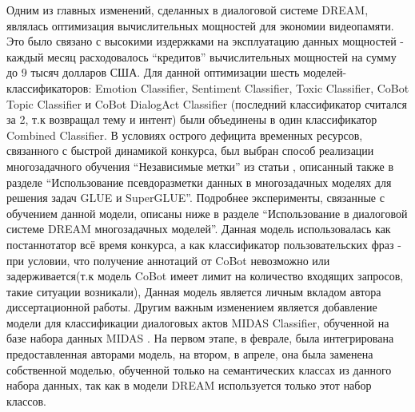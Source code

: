 Одним из главных изменений, сделанных в диалоговой системе DREAM, являлась оптимизация вычислительных мощностей для экономии видеопамяти. Это было связано с высокими издержками на эксплуатацию данных мощностей - каждый месяц расходовалось “кредитов” вычислительных мощностей на сумму до 9 тысяч долларов США. Для данной оптимизации шесть моделей-классификаторов: Emotion Classifier, Sentiment Classifier, Toxic Classifier, CoBot Topic Classifier и CoBot DialogAct Classifier (последний классификатор считался за 2, т.к возвращал тему и интент) были объединены в один классификатор Combined Classifier. В условиях острого дефицита временных ресурсов, связанного с быстрой динамикой конкурса, был выбран способ реализации многозадачного обучения “Независимые метки” из статьи  \cite{Karpov_Burtsev_2021}, описанный также в разделе “Использование псевдоразметки данных в многозадачных моделях для решения задач     GLUE и SuperGLUE”. Подробнее эксперименты, связанные с обучением данной модели, описаны ниже в разделе “Использование в диалоговой системе DREAM многозадачных моделей”. Данная модель использовалась как постаннотатор всё время конкурса, а как классификатор пользовательских фраз - при условии, что получение аннотаций от CoBot невозможно или задерживается(т.к модель CoBot имеет лимит на количество входящих запросов, такие ситуации возникали),  Данная модель является личным вкладом автора диссертационной работы. 
Другим важным изменением является добавление модели для классификации диалоговых актов MIDAS Classifier, обученной на базе набора данных MIDAS \cite{midas}. На первом этапе, в феврале, была интегрирована предоставленная авторами модель, на втором, в апреле, она была заменена собственной моделью, обученной только на семантических классах из данного набора данных, так как в модели DREAM используется только этот набор классов. 

